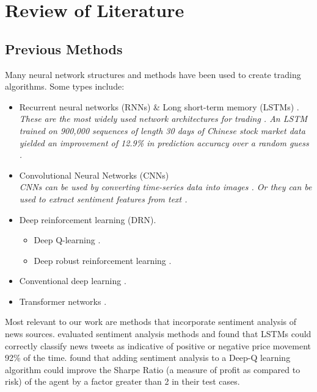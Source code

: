 \documentclass[conference]{IEEEtran}
\begin{document}
\section{Review of Literature}
\subsection{Previous Methods}
Many neural network structures and methods have been used to create trading algorithms. Some types include: 
\begin{itemize}
	\item Recurrent neural networks (RNNs) \& Long short-term memory (LSTMs) \cite{Chen2017}\cite{Mehta2021}.
	      \\\emph{These are the most widely used network architectures for trading \cite{Gu2020}. An LSTM trained on 900,000 sequences of length 30 days of Chinese stock market data yielded an improvement of 12.9\% in prediction accuracy over a random guess \cite{Chen2015}.}
	\item Convolutional Neural Networks (CNNs) \cite{Gu2020}
	      \\\emph{CNNs can be used by converting time-series data into images \cite{Sezer2018}. Or they can be used to extract sentiment features from text \cite{Shi2020}.}
	\item Deep reinforcement learning (DRN).
	      \begin{itemize}
	      	\item Deep Q-learning \cite{Wang2017} \cite{Nan2020}.
	      	\item Deep robust reinforcement learning \cite{Li2019}.
	      \end{itemize}
	\item Conventional deep learning \cite{Day2016}.
	\item Transformer networks \cite{Schmitz2020}.
\end{itemize}

Most relevant to our work are methods that incorporate sentiment analysis of news sources. \cite{Mehta2021} evaluated sentiment analysis methods and found that LSTMs could correctly classify news tweets as indicative of positive or negative price movement 92\% of the time. \cite{Nan2020} found that adding sentiment analysis to a Deep-Q learning algorithm could improve the Sharpe Ratio (a measure of profit as compared to risk) of the agent by a factor greater than 2 in their test cases.
\end{document}
